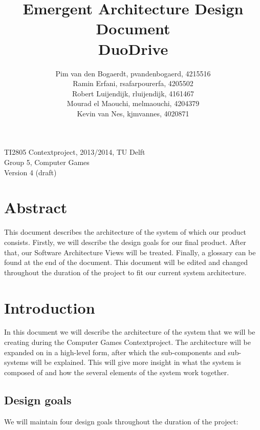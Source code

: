 \documentclass[11pt,twoside,a4paper]{article}
\title{
  Emergent Architecture Design Document\\
  DuoDrive
}
\author{
    Pim van den Bogaerdt, pvandenbogaerd, 4215516\\
    Ramin Erfani, rsafarpourerfa, 4205502\\
    Robert Luijendijk, rluijendijk, 4161467\\
    Mourad el Maouchi, melmaouchi, 4204379\\
    Kevin van Nes, kjmvannes, 4020871
}
\begin{document}
\maketitle
\begin{center}
TI2805 Contextproject, 2013/2014, TU Delft\\
Group 5, Computer Games\\
Version 4 (draft)
\end{center}
\clearpage


\section*{Abstract}
This document describes the architecture of the system of which our product consists. Firstly, we will describe the design goals for our final product. After that, our Software Architecture Views will be treated. Finally, a glossary can be found at the end of the document. This document will be edited and changed throughout the duration of the project to fit our current system architecture.


\clearpage
\tableofcontents

\clearpage


\section{Introduction}
In this document we will describe the architecture of the system that we will be creating during the Computer Games Contextproject. The architecture will be expanded on in a high-level form, after which the sub-components and sub-systems will be explained. This will give more insight in what the system is composed of and how the several elements of the system work together. 


\subsection{Design goals}
We will maintain four design goals throughout the duration of the project:
\end{document}
